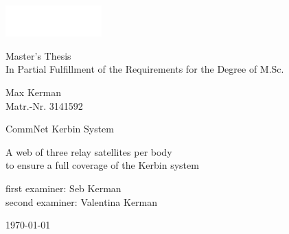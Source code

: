 \documentclass[12pt,paper=A4,numbers=noenddot,bibliography=totoc,listof=totoc,DIV=11,BCOR=1mm]{scrreprt}
\begin{document}
\begin{titlepage}
\pagecolor{dunkel}
\noindent
\hspace*{-3mm}\includegraphics[width=10em]{titlepagestuff/bild4}\\[-1.2em]
\color{white}
\makebox[0pt][l]{\rule{1.3\textwidth}{1pt}}
\par
\noindent
{}

\normalsize 
\vspace{20mm}
\noindent
\textsf{\LARGE Master's Thesis}\\[0.4ex]
\textsf{\small In Partial Fulfillment of the Requirements for the Degree of M.Sc.}

\vspace{5mm}
\noindent
\textsf{\LARGE Max Kerman}\\ \textsf{\small Matr.-Nr. 3141592}

\vspace{15mm}
\noindent
{\huge\textsf{CommNet Kerbin System}}

\vspace{5mm}
\noindent
{\Large\textsf{A web of three relay satellites per body\\ to ensure a full coverage of the Kerbin system}}


\vfill
\noindent
\textsf{\large%
first examiner: Seb Kerman\\
second examiner: Valentina Kerman
}

\vspace{3mm}
\noindent
\textsf{\large \today}
\end{titlepage}
\restoregeometry %
\nopagecolor %


\tableofcontents
\end{document}
